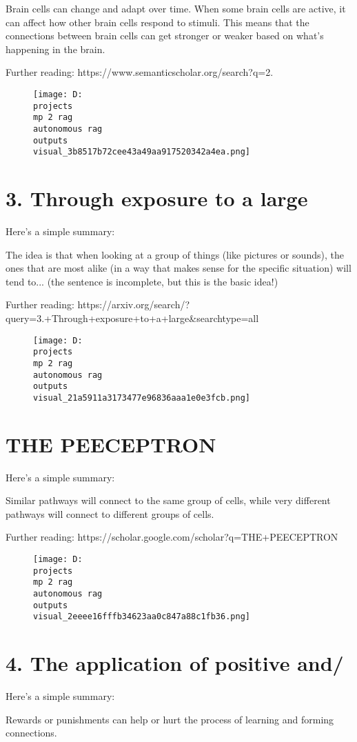 \documentclass[12pt,a4paper]{article}
\begin{document}
Brain cells can change and adapt over time. When some brain cells are active, it can affect how other brain cells respond to stimuli. This means that the connections between brain cells can get stronger or weaker based on what's happening in the brain.

Further reading: https://www.semanticscholar.org/search?q=2.%
\begin{figure}[h]
\centering
\texttt{[image: D:\\projects\\mp 2 rag\\autonomous rag\\outputs\\visual\_3b8517b72cee43a49aa917520342a4ea.png]}
\end{figure}
\section{3. Through exposure to a large}
Here's a simple summary:

The idea is that when looking at a group of things (like pictures or sounds), the ones that are most alike (in a way that makes sense for the specific situation) will tend to... (the sentence is incomplete, but this is the basic idea!)

Further reading: https://arxiv.org/search/?query=3.+Through+exposure+to+a+large&searchtype=all
\begin{figure}[h]
\centering
\texttt{[image: D:\\projects\\mp 2 rag\\autonomous rag\\outputs\\visual\_21a5911a3173477e96836aaa1e0e3fcb.png]}
\end{figure}
\section{THE PEECEPTRON}
Here's a simple summary:

Similar pathways will connect to the same group of cells, while very different pathways will connect to different groups of cells.

Further reading: https://scholar.google.com/scholar?q=THE+PEECEPTRON
\begin{figure}[h]
\centering
\texttt{[image: D:\\projects\\mp 2 rag\\autonomous rag\\outputs\\visual\_2eeee16fffb34623aa0c847a88c1fb36.png]}
\end{figure}
\section{4. The application of positive and/}
Here's a simple summary:

Rewards or punishments can help or hurt the process of learning and forming connections.
\end{document}
